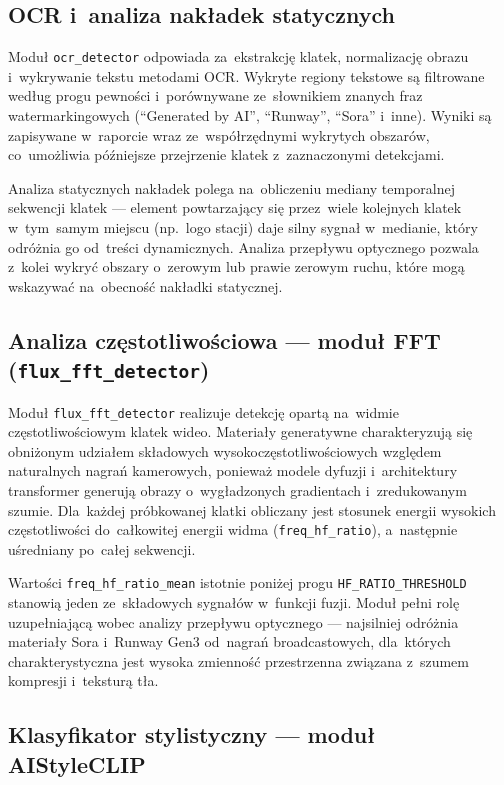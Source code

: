 \subsection*{OCR i~analiza nakładek statycznych}

Moduł \texttt{ocr\_detector} odpowiada za~ekstrakcję klatek, normalizację obrazu
i~wykrywanie tekstu metodami OCR. Wykryte regiony tekstowe są filtrowane według
progu pewności i~porównywane ze~słownikiem znanych fraz watermarkingowych
(\enquote{Generated by AI}, \enquote{Runway}, \enquote{Sora} i~inne).
Wyniki są zapisywane w~raporcie wraz ze~współrzędnymi wykrytych obszarów,
co~umożliwia późniejsze przejrzenie klatek z~zaznaczonymi detekcjami.

Analiza statycznych nakładek polega na~obliczeniu mediany temporalnej sekwencji klatek
--- element powtarzający się przez~wiele kolejnych klatek w~tym~samym miejscu
(np.\ logo stacji) daje silny sygnał w~medianie, który odróżnia go
od~treści dynamicznych. Analiza przepływu optycznego pozwala z~kolei wykryć
obszary o~zerowym lub prawie zerowym ruchu, które mogą wskazywać
na~obecność nakładki statycznej.

\subsection*{Analiza częstotliwościowa --- moduł FFT (\texttt{flux\_fft\_detector})}

Moduł \texttt{flux\_fft\_detector} realizuje detekcję opartą na~widmie
częstotliwościowym klatek wideo. Materiały generatywne charakteryzują się
obniżonym udziałem składowych wysokoczęstotliwościowych względem naturalnych
nagrań kamerowych, ponieważ modele dyfuzji i~architektury transformer
generują obrazy o~wygładzonych gradientach i~zredukowanym szumie.
Dla~każdej próbkowanej klatki obliczany jest stosunek energii wysokich
częstotliwości do~całkowitej energii widma (\texttt{freq\_hf\_ratio}),
a~następnie uśredniany po~całej sekwencji.

Wartości \texttt{freq\_hf\_ratio\_mean} istotnie poniżej progu
\texttt{HF\_RATIO\_THRESHOLD} stanowią jeden ze~składowych sygnałów
w~funkcji fuzji. Moduł pełni rolę uzupełniającą wobec analizy przepływu
optycznego --- najsilniej odróżnia materiały Sora i~Runway Gen3 od~nagrań
broadcastowych, dla~których charakterystyczna jest wysoka zmienność
przestrzenna związana z~szumem kompresji i~teksturą tła.

\subsection*{Klasyfikator stylistyczny --- moduł AIStyleCLIP}

